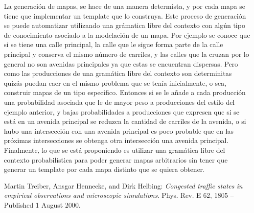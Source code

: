 \documentclass[colorinlistoftodos,twoside,twocolumn]{article} %
\begin{document}
	La generación de mapas, se hace de una manera determista, y por cada mapa se tiene que implementar un template que lo construya. Este proceso de generación se puede automatizar utilizando una grámatica libre del contexto con algún tipo de conocimiento asociado a la modelación de un mapa. Por ejemplo se conoce que si se tiene una calle principal, la calle que le sigue forma parte de la calle principal y conserva el mismo número de carriles, y las calles que la cruzan por lo general no son avenidas principales ya que estas se encuentran dispersas. Pero como las producciones de una gramática libre del contexto son determinitas quizás puedan caer en el mismo problema que se tenía inicialmente, o sea, construir mapas de un tipo específico. Entonces si se le añade a cada producción una probabilidad asociada que le de mayor peso a producciones del estilo del ejemplo anterior, y bajas probabilidades a producciones que expresen que si se está en un avenida principal se reduzca la cantidad de carriles de la avenida, o si hubo una intersección con una avenida principal es poco probable que en las próximas intersecciones se obtenga otra intersección una avenida principal. Finalmente, lo que se está proponiendo es utilizar una gramática libre del contexto probabilística para poder generar mapas arbitrarios sin tener que generar un template por cada mapa distinto que se quiera obtener.

	\listoftodos

\begin{thebibliography}{20}
	 Martin Treiber, Ansgar Hennecke, and Dirk Helbing: \emph{Congested traffic states in empirical observations and microscopic simulations}. Phys. Rev. E 62, 1805 – Published 1 August 2000.
\end{thebibliography}
\end{document}
